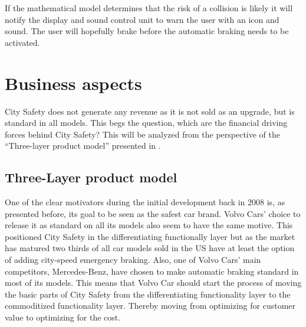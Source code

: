 \documentclass[conference]{IEEEtran}
\begin{document}
If the mathematical model determines that the risk of a collision is likely it will notify the display and sound control unit to warn the user with an icon and sound. The user will hopefully brake before the automatic braking needs to be activated. \cite{CitySafetyDefinition}


\section{Business aspects}
City Safety does not generate any revenue as it is not sold as an upgrade, but is standard in all models. This begs the question, which are the financial driving forces behind City Safety? This will be analyzed from the perspective of the ``Three-layer product model'' presented in \cite{TeLESM}.

\subsection{Three-Layer product model}
One of the clear motivators during the initial development back in 2008 is, as presented before, its goal to be seen as the safest car brand. Volvo Cars' choice to release it as standard on all its models also seem to have the same motive. This positioned City Safety in the differentiating functionally layer but as the market has matured two thirds of all car models sold in the US have at least the option of adding city-speed emergency braking. Also, one of Volvo Cars' main competitors, Mercedes-Benz, have chosen to make automatic braking standard in most of its models.  \cite{AEBStatistics} This means that Volvo Car should start the process of moving the basic parts of City Safety from the differentiating functionality layer to the commoditized functionality layer. Thereby moving from optimizing for customer value to optimizing for the cost.
\end{document}
